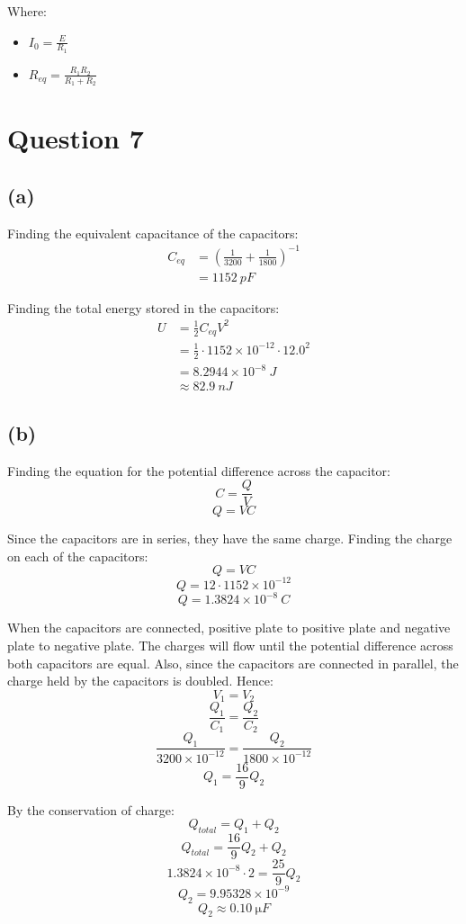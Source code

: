 \documentclass[11pt]{article}
\begin{document}
Where:
\begin{itemize}
\item \(I_0 = \frac{E}{R_1}\)
\item \(R_{eq} = \frac{R_1 R_2}{R_1 + R_2}\)
\end{itemize}
\section{Question 7}
\label{sec:orgd81437c}

\subsection{(a)}
\label{sec:org0faec0a}
Finding the equivalent capacitance of the capacitors:
\begin{align*}
C_{eq} &= \left( \frac{1}{3200} + \frac{1}{1800} \right)^{-1} \\
&= \qty{1152}{\unit{pF}}
\end{align*}

Finding the total energy stored in the capacitors:
\begin{align*}
U &= \frac{1}{2} C_{eq} V^2 \\
&= \frac{1}{2} \cdot 1152 \times 10^{-12} \cdot 12.0^2 \\
&= 8.2944 \times 10^{-8} \ \unit{J} \\
&\approx \qty{82.9}{\unit{nJ}}
\end{align*}
\subsection{(b)}
\label{sec:orgee9cadd}
Finding the equation for the potential difference across the capacitor:
\[C = \frac{Q}{V}\]
\[Q = VC\]

Since the capacitors are in series, they have the same charge. Finding the charge on each of the capacitors:
\[Q = VC\]
\[Q = 12 \cdot 1152 \times 10^{-12}\]
\[Q = 1.3824 \times 10^{-8} \ \unit{C}\]

When the capacitors are connected, positive plate to positive plate and negative plate to negative plate. The charges will flow until the potential difference across both capacitors are equal. Also, since the capacitors are connected in parallel, the charge held by the capacitors is doubled. Hence:
\[V_1 = V_2\]
\[\frac{Q_1}{C_1} = \frac{Q_2}{C_2}\]
\[\frac{Q_1}{3200 \times 10^{-12}} = \frac{Q_2}{1800 \times 10^{-12}}\]
\[Q_1 = \frac{16}{9}Q_2 \tag{1}\]

By the conservation of charge:
\[Q_{total} = Q_1 + Q_2\]
\[Q_{total} = \frac{16}{9} Q_2 + Q_2\]
\[1.3824 \times 10^{-8} \cdot 2  = \frac{25}{9} Q_2\]
\[Q_2 = 9.95328 \times 10^{-9}\]
\[Q_2 \approx \qty{0.10}{\unit{\micro F}}\]
\end{document}
